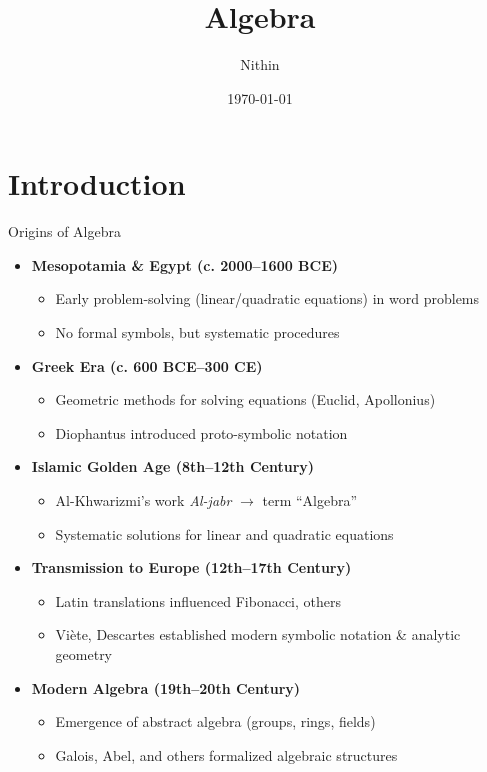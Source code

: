 \documentclass{beamer}
\title{Algebra}
\author{Nithin}
\institute{Maveric Systems}
\date{\today}
\begin{document}
\frame{\titlepage}
\section{Introduction}
\begin{frame}{Origins of Algebra}
    \begin{itemize}
      \item \textbf{Mesopotamia \& Egypt (c. 2000–1600 BCE)}
        \begin{itemize}
          \item Early problem-solving (linear/quadratic equations) in word problems
          \item No formal symbols, but systematic procedures
        \end{itemize}
  
      \item \textbf{Greek Era (c. 600 BCE–300 CE)}
        \begin{itemize}
          \item Geometric methods for solving equations (Euclid, Apollonius)
          \item Diophantus introduced proto-symbolic notation
        \end{itemize}
  
      \item \textbf{Islamic Golden Age (8th–12th Century)}
        \begin{itemize}
          \item Al-Khwarizmi’s work \emph{Al-jabr} $\rightarrow$ term “Algebra”
          \item Systematic solutions for linear and quadratic equations
        \end{itemize}
  
      \item \textbf{Transmission to Europe (12th–17th Century)}
        \begin{itemize}
          \item Latin translations influenced Fibonacci, others
          \item Viète, Descartes established modern symbolic notation \& analytic geometry
        \end{itemize}
  
      \item \textbf{Modern Algebra (19th–20th Century)}
        \begin{itemize}
          \item Emergence of abstract algebra (groups, rings, fields)
          \item Galois, Abel, and others formalized algebraic structures
        \end{itemize}
    \end{itemize}
  \end{frame}
\end{document}
